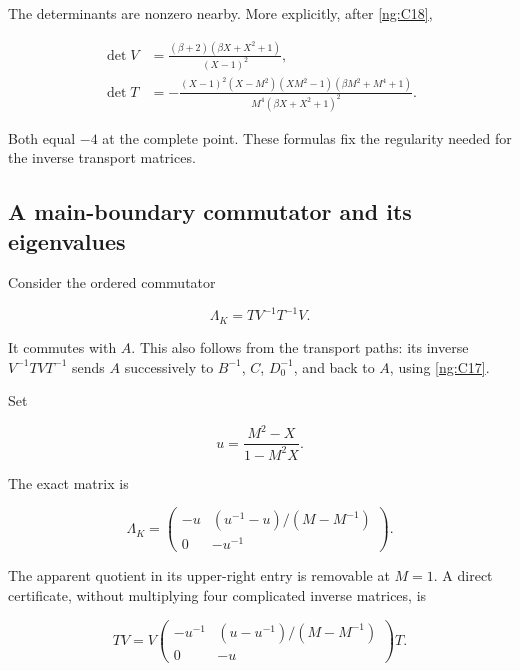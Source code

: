 The determinants are nonzero nearby. More explicitly, after \eqref{ng:C18},

\begin{equation}\label{ng:C22}
\begin{aligned}
 \det V&=\frac{(\beta+2)(\beta X+X^2+1)}{(X-1)^2},\\
 \det T&=
 -\frac{(X-1)^2(X-M^2)(XM^2-1)
                (\beta M^2+M^4+1)}
 {M^4(\beta X+X^2+1)^2}.
 \end{aligned}
\end{equation}

Both equal \(-4\) at the complete point. These formulas fix the regularity needed for the inverse transport matrices.

\subsection{A main-boundary commutator and its eigenvalues}\label{ng:the-main-commutator-gives-the-source-longitude-factor}

Consider the ordered commutator

\begin{equation}\label{ng:C23}
\Lambda_K=T V^{-1}T^{-1}V.
\end{equation}

It commutes with \(A\). This also follows from the transport paths: its inverse \(V^{-1}TVT^{-1}\) sends \(A\) successively to \(B^{-1}\), \(C\), \(D_0^{-1}\), and back to \(A\), using \eqref{ng:C17}.

Set

\begin{equation}\label{ng:C24}
u=\frac{M^2-X}{1-M^2X}.
\end{equation}

The exact matrix is

\begin{equation}\label{ng:C25}
\Lambda_K=
 \begin{pmatrix}
 -u & (u^{-1}-u)/(M-M^{-1})\\
 0  & -u^{-1}
 \end{pmatrix}.
\end{equation}

The apparent quotient in its upper-right entry is removable at \(M=1\). A direct certificate, without multiplying four complicated inverse matrices, is

\begin{equation}\label{ng:C26}
T V=V
 \begin{pmatrix}
 -u^{-1}&(u-u^{-1})/(M-M^{-1})\\
 0&-u
 \end{pmatrix}T.
\end{equation}

